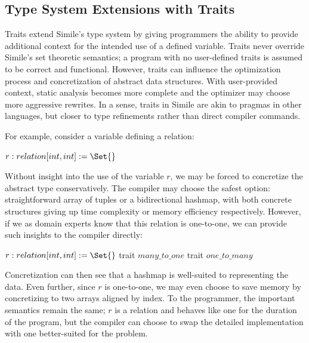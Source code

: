 
\subsection{Type System Extensions with Traits}

Traits extend Simile's type system by giving programmers the ability to provide additional context for the intended use of a defined variable. Traits never override Simile's set theoretic semantics; a program with no user-defined traits is assumed to be correct and functional. However, traits can influence the optimization process and concretization of abstract data structures.  With user-provided context, static analysis becomes more complete and the optimizer may choose more aggressive rewrites. In a sense, traits in Simile are akin to pragmas in other languages, but closer to type refinements rather than direct compiler commands.

For example, consider a variable defining a relation:
\begin{algorithmic}
  \State $r: relation[int, int] := \Set{}$
\end{algorithmic}
Without insight into the use of the variable $r$, we may be forced to concretize the abstract type conservatively. The compiler may choose the safest option: straightforward array of tuples or a bidirectional hashmap, with both concrete structures giving up time complexity or memory efficiency respectively. However, if we as domain experts know that this relation is one-to-one, we can provide such insights to the compiler directly:
\begin{algorithmic}
  \State $r: relation[int, int] := \Set{}$
  \State \quad trait $many\_to\_one$
  \State \quad trait $one\_to\_many$
\end{algorithmic}
Concretization can then see that a hashmap is well-suited to representing the data. Even further, since $r$ is one-to-one, we may even choose to save memory by concretizing to two arrays aligned by index. To the programmer, the important semantics remain the same; $r$ is a relation and behaves like one for the duration of the program, but the compiler can choose to swap the detailed implementation with one better-suited for the problem.

